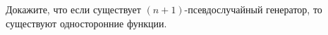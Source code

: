 Докажите, что если существует $(n + 1)$-псевдослучайный генератор, то существуют односторонние функции.
